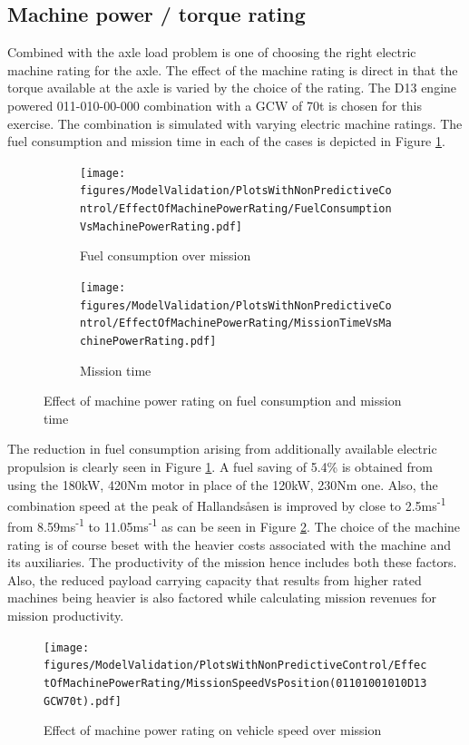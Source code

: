 \documentclass[ExampleMasters.tex]{subfiles}
\begin{document}
\subsection{Machine power / torque rating}
Combined with the axle load problem is one of choosing the right electric machine rating for the axle. The effect of the machine rating is direct in that the torque available at the axle is varied by the choice of the rating. The D13 engine powered 011-010-00-000 combination with a GCW of 70t is chosen for this exercise. The combination is simulated with varying electric machine ratings. The fuel consumption and mission time in each of the cases is depicted in Figure \ref{fuelTimeEngineAxleLoad}.
\begin{figure}
\begin{subfigure}{.5\textwidth}
\centering
\texttt{[image: figures/ModelValidation/PlotsWithNonPredictiveControl/EffectOfMachinePowerRating/FuelConsumptionVsMachinePowerRating.pdf]}
\caption{Fuel consumption over mission}
\end{subfigure}
\begin{subfigure}{.5\textwidth}
\centering
\texttt{[image: figures/ModelValidation/PlotsWithNonPredictiveControl/EffectOfMachinePowerRating/MissionTimeVsMachinePowerRating.pdf]}
\caption{Mission time}
\end{subfigure}
\caption{Effect of machine power rating on fuel consumption and mission time}
\label{fuelTimeEngineAxleLoad}
\end{figure}
The reduction in fuel consumption arising from additionally available electric propulsion is clearly seen in Figure \ref{fuelTimeEngineAxleLoad}. A fuel saving of 5.4\% is obtained from using the 180kW, 420Nm motor in place of the 120kW, 230Nm one. Also, the combination speed at the peak of Hallands\aa sen is improved by close to 2.5ms\textsuperscript{-1} from 8.59ms\textsuperscript{-1} to 11.05ms\textsuperscript{-1} as can be seen in Figure \ref{speedMissionMachineRating}. The choice of the machine rating is of course beset with the heavier costs associated with the machine and its auxiliaries. The productivity of the mission hence includes both these factors. Also, the reduced payload carrying capacity that results from higher rated machines being heavier is also factored while calculating mission revenues for mission productivity.

\begin{figure}
\centering
\texttt{[image: figures/ModelValidation/PlotsWithNonPredictiveControl/EffectOfMachinePowerRating/MissionSpeedVsPosition(01101001010D13GCW70t).pdf]}
\caption{Effect of machine power rating on vehicle speed over mission}
\label{speedMissionMachineRating}
\end{figure}
\end{document}
